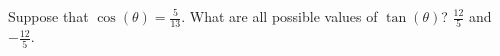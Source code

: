 {Suppose that $\cos{(\theta)}=\frac{5}{13}$. What are all possible values of $\tan{(\theta)}$?}
{$\frac{12}{5}$ and $-\frac{12}{5}$.}
